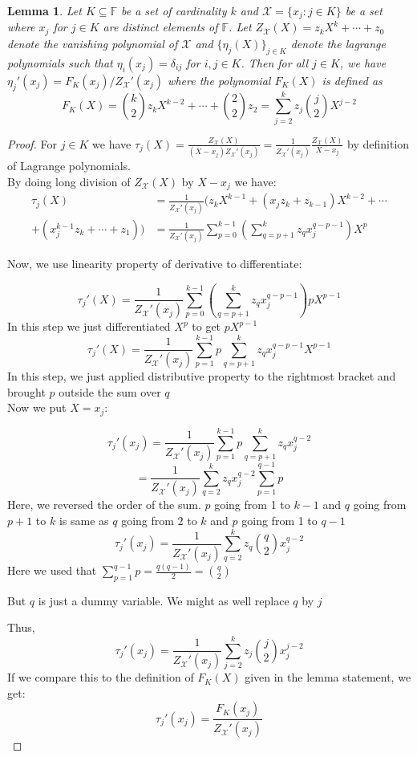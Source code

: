 \documentclass[sigconf]{acmart}
\newtheorem{lemma}{Lemma}[section]
\newcommand{\F}{\mathbb{F}}
\begin{document}
	\begin{lemma}\label{lem:tau}
		Let $K\subseteq \F$ be a set of cardinality $k$ and $\mathcal{X}=\{x_j:j\in K\}$ be a set
		where $x_j$ for $j\in K$ are distinct elements of $\F$. Let $Z_\mathcal{X}(X)=z_k X^k+\cdots+z_0$ denote the vanishing polynomial of $\mathcal{X}$
		and $\{\eta_j(X)\}_{j\in K}$ denote the lagrange polynomials such that $\eta_i(x_j)=\delta_{ij}$ for $i,j\in K$. Then for all $j\in K$,
		we have $\eta_j'(x_j)=F_K(x_j)/Z_\mathcal{X}'(x_j)$ where the polynomial
		$F_K(X)$ is defined as
		\[F_K(X)=\binom{k}{2}z_k X^{k-2}+\cdots+\binom{2}{2}z_2=\sum_{j=2}^k z_j\binom{j}{2}X^{j-2} \]
	\end{lemma}
	\begin{proof}
		For $j\in K$ we have $\tau_j(X)=\frac{Z_\mathcal{X}(X)}{(X-x_j)Z_\mathcal{X}'(x_j)}= \frac{1}{Z_\mathcal{X}'(x_j)}\frac{Z_\mathcal{X}(X)}{X-x_j}$ by definition of Lagrange polynomials.\\
		By doing long division of $Z_\mathcal{X}(X)$
		by $X-x_j$ we have:
		\begin{align*}
			\tau_j(X) &= \frac{1}{Z_\mathcal{X}'(x_j)}\big(z_k X^{k-1} + (x_jz_k + z_{k-1})X^{k-2} + \cdots\\ +
			(x_j^{k-1}z_k + \cdots + z_1)\big)
			&= \frac{1}{Z_\mathcal{X}'(x_j)}\sum_{p=0}^{k-1} \left(\sum_{q=p+1}^k z_q x_j^{q-p-1}\right)X^p
		\end{align*}
		
		Now, we use linearity property of derivative to differentiate:
		
		$$   \tau_j'(X) = \frac{1}{Z_\mathcal{X}'(x_j)}\sum_{p=0}^{k-1} \left(\sum_{q=p+1}^{k}z_q x_j^{q-p-1}\right)p X^{p-1} $$
		In this step we just differentiated $X^p$ to get $p X^{p-1}$
		$$ \tau_j'(X) = \frac{1}{Z_\mathcal{X}'(x_j)}\sum_{p=1}^{k-1} p  \sum_{q=p+1}^{k}z_q x_j^{q-p-1} X^{p-1} $$
		In this step, we just applied distributive property to the rightmost bracket and brought $p$ outside the sum over $q$\\
		Now we put $X=x_j$:
		
		$$\tau_j'(x_j) = \frac{1}{Z_\mathcal{X}'(x_j)} \sum_{p=1}^{k-1} p \sum_{q=p+1}^k z_q x_j^{q-2} $$
		$$= \frac{1}{Z_\mathcal{X}'(x_j)}\sum_{q=2}^k z_q x_j^{q-2} \sum_{p=1}^{q-1} p $$
		Here, we reversed the order of the sum. $p$ going from 1 to $k-1$ and $q$ going from $p+1$ to $k$ is same as $q$ going from $2$ to $k$ and $p$ going from 1 to $q-1$
		$$\tau_j'(x_j)= \frac{1}{Z_\mathcal{X}'(x_j)}\sum_{q=2}^k z_q \binom{q}{2} x_j^{q-2} $$
		Here we used that $\sum_{p=1}^{q-1}p=\frac{q(q-1)}{2}=\binom{q}{2}$
		
		But $q$ is just a dummy variable. We might as well replace $q$ by $j$
		
		Thus, $$\tau_j'(x_j)= \frac{1}{Z_\mathcal{X}'(x_j)}\sum_{j=2}^k z_j \binom{j}{2} x_j^{j-2} $$
		If we compare this to the definition of $F_K(X)$ given in the lemma statement, we get:
		$$\tau_j'(x_j)= \frac{F_K(x_j)}{Z_\mathcal{X}'(x_j)}$$
		
		
	\end{proof}
	
\end{document}

